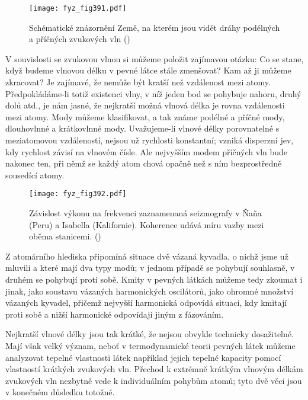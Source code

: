 {  \begin{figure}[ht!] %
    \centering
    \texttt{[image: fyz\_fig391.pdf]}
    \caption{Schématické znázornění Země, na kterém jsou vidět dráhy podélných a příčných zvukových 
             vln
             (\cite[s.~690]{Feynman01})}
    \label{fyz:fig391}
  \end{figure}
  
  V souvislosti se zvukovou vlnou si můžeme položit zajímavou otázku: Co se stane, když budeme 
  vlnovou délku v pevné látce stále zmenšovat? Kam až ji můžeme zkracovat? Je zajímavé, že nemůže 
  být kratší než vzdálenost mezi atomy. Předpokládáme-li totiž existenci vlny, v níž jeden bod se 
  pohybuje nahoru, druhý dolů atd., je nám jasné, že nejkratší možná vlnová délka je rovna 
  vzdálenosti mezi atomy. Mody můžeme klasifikovat, a tak známe podélné a příčné mody, dlouhovlnné 
  a krátkovlnné mody. Uvažujeme-li vlnové délky porovnatelné s meziatomovou vzdáleností, nejsou už 
  rychlosti konstantní; vzniká disperzní jev, kdy rychlost závisí na vlnovém čísle. Ale nejvyšším 
  modem příčných vln bude nakonec ten, při němž se každý atom chová opačně než s ním bezprostředně 
  sousedící atomy. 

  \begin{figure*} %
    \centering
    \texttt{[image: fyz\_fig392.pdf]}
    \caption{Závislost výkonu na frekvenci zaznamenaná seizmografy v Ñaña (Peru) a Isabella 
             (Kalifornie). Koherence udává míru vazby mezi oběma stanicemi. 
             (\cite[s.~693]{Feynman01})}
    \label{fyz:fig392}
  \end{figure*}
  Z atomárního hlediska připomíná situace dvě vázaná kyvadla, o nichž jsme už mluvili a které mají 
  dva typy modů; v jednom případě se pohybují souhlasně, v druhém se pohybují proti sobě. Kmity v 
  pevných látkách můžeme tedy zkoumat i jinak, jako soustavu vázaných harmonických oscilátorů, jako 
  ohromné množství vázaných kyvadel, přičemž nejvyšší harmonická odpovídá situaci, kdy kmitají 
  proti sobě a nižší harmonické odpovídají jiným z fázováním. 
  
  Nejkratší vlnové délky jsou tak krátké, že nejsou obvykle technicky dosažitelné. Mají však velký 
  význam, neboť v termodynamické teorii pevných látek můžeme analyzovat tepelné vlastnosti látek 
  například jejich tepelné kapacity pomocí vlastností krátkých zvukových vln. Přechod k extrémně 
  krátkým vlnovým délkám zvukových vln nezbytně vede k individuálním pohybům atomů; tyto dvě věci 
  jsou v konečném důsledku totožné. 

}
